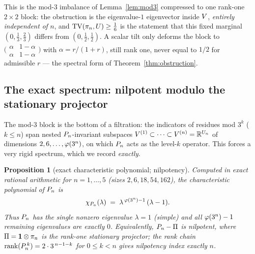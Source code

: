 \documentclass[11pt]{amsart}
\newtheorem{proposition}[theorem]{Proposition}
\theoremstyle{definition}
\theoremstyle{remark}
\begin{document}
This is the mod-$3$ imbalance of Lemma~\ref{lem:mod3} compressed to one rank-one $2\times2$ block:
the obstruction is the eigenvalue-$1$ eigenvector inside $V$, \emph{entirely independent of $n$},
and $\mathrm{TV}(\pi_n,U)\ge\tfrac16$ is the statement that this fixed marginal $(0,\tfrac13,\tfrac23)$ differs
from $(0,\tfrac12,\tfrac12)$. A scalar tilt only deforms the block to $\big(\begin{smallmatrix}
\alpha&1-\alpha\\\alpha&1-\alpha\end{smallmatrix}\big)$ with $\alpha=r/(1+r)$, still rank one, never
equal to $1/2$ for admissible $r$ --- the spectral form of Theorem~\ref{thm:obstruction}.

\subsection{The exact spectrum: nilpotent modulo the stationary projector}
The mod-$3$ block is the bottom of a filtration: the indicators of residues mod $3^k$ ($k\le n$) span
nested $P_n$-invariant subspaces $V^{(1)}\subset\cdots\subset V^{(n)}=\mathbb{R}^{U_n}$ of
dimensions $2,6,\dots,\varphi(3^n)$, on which $P_n$ acts as the level-$k$ operator. This forces a very
rigid spectrum, which we record \emph{exactly}.

\begin{proposition}[exact characteristic polynomial; nilpotency]\label{prop:nilpotent}
Computed in exact rational arithmetic for $n=1,\dots,5$ (sizes $2,6,18,54,162$), the characteristic
polynomial of $P_n$ is
\begin{equation}
   \chi_{P_n}(\lambda)\;=\;\lambda^{\,\varphi(3^n)-1}\,(\lambda-1).
   \label{eq:charpoly}
\end{equation}
Thus $P_n$ has the single nonzero eigenvalue $\lambda=1$ (simple) and all $\varphi(3^n)-1$ remaining
eigenvalues are \emph{exactly} $0$. Equivalently, $P_n-\Pi$ is nilpotent, where
$\Pi=\mathbf{1}\otimes\pi_n$ is the rank-one stationary projector; the rank chain
$\mathrm{rank}(P_n^{\,k})=2\cdot3^{\,n-1-k}$ for $0\le k<n$ gives nilpotency index exactly $n$.
\end{proposition}
\end{document}
